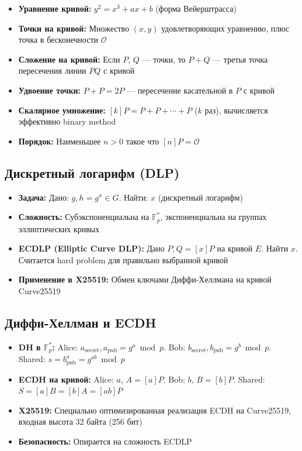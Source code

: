 \documentclass[11pt,a4paper,oneside]{book}
\begin{document}
\begin{itemize}
  \item \textbf{Уравнение кривой:} $y^2 = x^3 + ax + b$ (форма Вейерштрасса)
  \item \textbf{Точки на кривой:} Множество $(x, y)$ удовлетворяющих уравнению, плюс точка в бесконечности $\mathcal{O}$
  \item \textbf{Сложение на кривой:} Если $P$, $Q$ — точки, то $P + Q$ — третья точка пересечения линии $PQ$ с кривой
  \item \textbf{Удвоение точки:} $P + P = 2P$ — пересечение касательной в $P$ с кривой
  \item \textbf{Скалярное умножение:} $[k]P = P + P + \cdots + P$ ($k$ раз), вычисляется эффективно binary method
  \item \textbf{Порядок:} Наименьшее $n > 0$ такое что $[n]P = \mathcal{O}$
\end{itemize}
\vspace{-0.2cm}\subsection{Дискретный логарифм (DLP)}
\begin{itemize}
  \item \textbf{Задача:} Дано: $g, h = g^x \in G$. Найти: $x$ (дискретный логарифм)
  \item \textbf{Сложность:} Субэкспоненциальна на $\mathbb{F}_p^*$, экспоненциальна на группах эллиптических кривых
  \item \textbf{ECDLP (Elliptic Curve DLP):} Дано $P, Q = [x]P$ на кривой $E$. Найти $x$. Считается hard problem для правильно выбранной кривой
  \item \textbf{Применение в X25519:} Обмен ключами Диффи-Хеллмана на кривой Curve25519
\end{itemize}
\vspace{-0.2cm}\subsection{Диффи-Хеллман и ECDH}
\begin{itemize}
  \item \textbf{DH в $\mathbb{F}_p^*$:} Alice: $a_{\text{secret}}, a_{\text{pub}} = g^a \bmod p$. Bob: $b_{\text{secret}}, b_{\text{pub}} = g^b \bmod p$. Shared: $s = b_{\text{pub}}^a = g^{ab} \bmod p$
  \item \textbf{ECDH на кривой:} Alice: $a$, $A = [a]P$. Bob: $b$, $B = [b]P$. Shared: $S = [a]B = [b]A = [ab]P$
  \item \textbf{X25519:} Специально оптимизированная реализация ECDH на Curve25519, входная высота 32 байта (256 бит)
  \item \textbf{Безопасность:} Опирается на сложность ECDLP
\end{itemize}
\end{document}
